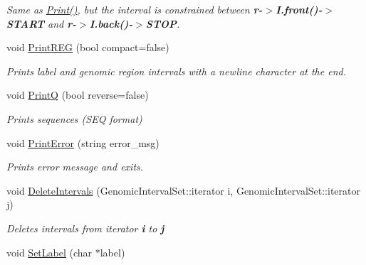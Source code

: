 \begin{DoxyCompactItemize}
\begin{DoxyCompactList}\small\item\em Same as \hyperlink{classGenomicRegion_a40397d1fab7b00e5f04b9f7e52f0114e}{Print()}, but the interval is constrained between {\bfseries r-\/$>$I.front()-\/$>$START} and {\bfseries r-\/$>$I.back()-\/$>$STOP}. \end{DoxyCompactList}\item 
\hypertarget{classGenomicRegion_a9c687565a8ed25da5a5ccf08e5e8461e}{
void \hyperlink{classGenomicRegion_a9c687565a8ed25da5a5ccf08e5e8461e}{PrintREG} (bool compact=false)}
\label{classGenomicRegion_a9c687565a8ed25da5a5ccf08e5e8461e}

\begin{DoxyCompactList}\small\item\em Prints label and genomic region intervals with a newline character at the end. \end{DoxyCompactList}\item 
\hypertarget{classGenomicRegion_a9a00b031d4a119181b8b76ffa34a6f47}{
void \hyperlink{classGenomicRegion_a9a00b031d4a119181b8b76ffa34a6f47}{PrintQ} (bool reverse=false)}
\label{classGenomicRegion_a9a00b031d4a119181b8b76ffa34a6f47}

\begin{DoxyCompactList}\small\item\em Prints sequences (SEQ format) \end{DoxyCompactList}\item 
\hypertarget{classGenomicRegion_a68ecc1c8c76e9204f6e27801f0ba3d5f}{
void \hyperlink{classGenomicRegion_a68ecc1c8c76e9204f6e27801f0ba3d5f}{PrintError} (string error\_\-msg)}
\label{classGenomicRegion_a68ecc1c8c76e9204f6e27801f0ba3d5f}

\begin{DoxyCompactList}\small\item\em Prints error message and exits. \end{DoxyCompactList}\item 
\hypertarget{classGenomicRegion_aad8566a736786134b72e7bf74296e807}{
void \hyperlink{classGenomicRegion_aad8566a736786134b72e7bf74296e807}{DeleteIntervals} (GenomicIntervalSet::iterator i, GenomicIntervalSet::iterator j)}
\label{classGenomicRegion_aad8566a736786134b72e7bf74296e807}

\begin{DoxyCompactList}\small\item\em Deletes intervals from iterator {\bfseries i} to {\bfseries j} \end{DoxyCompactList}\item 
\hypertarget{classGenomicRegion_abc547e770917e859fa434d6c54954916}{
void \hyperlink{classGenomicRegion_abc547e770917e859fa434d6c54954916}{SetLabel} (char $\ast$label)}
\label{classGenomicRegion_abc547e770917e859fa434d6c54954916}


\end{DoxyCompactItemize}
